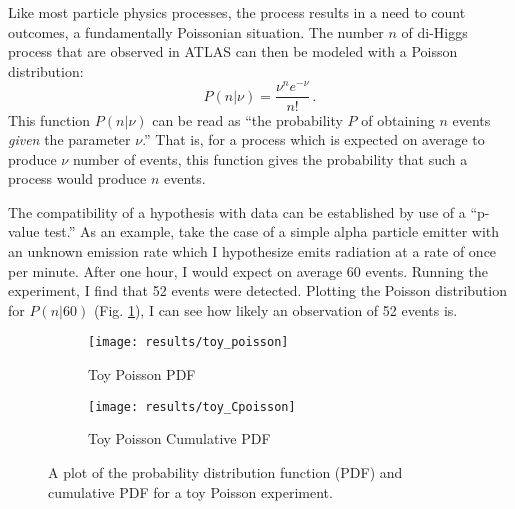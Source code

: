     Like most particle physics processes, the \vbfhhproc process results in a need to count outcomes,
        a fundamentally Poissonian situation.
    The number $n$ of di-Higgs process that are observed in ATLAS can then be modeled with a Poisson distribution\cite{cranmer2015practical}:
    \begin{equation}
        P(n|\nu) = \frac{ \nu^n e^{-\nu} }{n!}
        \,.
    \end{equation}
    This function $P(n|\nu)$ can be read as ``the probability $P$ of obtaining $n$ events \textit{given} the parameter $\nu$.''
    That is, for a process which is expected on average to produce $\nu$ number of events,
        this function gives the probability that such a process would produce $n$ events.

    The compatibility of a hypothesis with data can be established by use of a ``p-value test.''
    As an example, take the case of a simple alpha particle emitter with an unknown emission rate
        which I hypothesize emits radiation at a rate of once per minute.
    After one hour, I would expect on average 60 events.
    Running the experiment, I find that 52 events were detected.
    Plotting the Poisson distribution for $P(n|60)$ (Fig. \ref{fig:poisson_toy_sig:pdf}),
        I can see how likely an observation of 52 events is.
    \begin{figure}
        \centering
        \begin{subfigure}{0.48\textwidth} 
            \texttt{[image: results/toy\_poisson]}
            \caption{Toy Poisson PDF}
            \label{fig:poisson_toy_sig:pdf}
        \end{subfigure}
        \begin{subfigure}{0.48\textwidth}
            \texttt{[image: results/toy\_Cpoisson]}
            \caption{Toy Poisson Cumulative PDF}
            \label{fig:poisson_toy_sig:Cpdf}
        \end{subfigure}
        \caption{
            A plot of the probability distribution function (PDF)
                and cumulative PDF for a toy Poisson experiment.
        }
    \end{figure}


